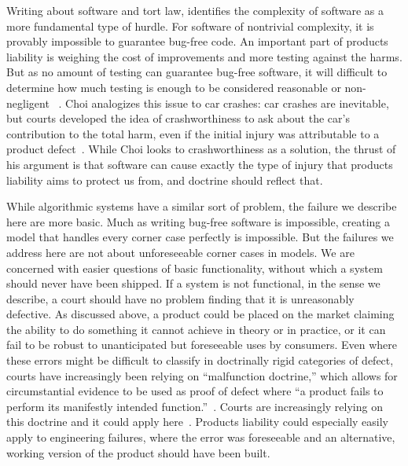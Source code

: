 \documentclass[acmconf,manuscript,screen,natbib=true]{acmart}
\begin{document}
Writing about software and tort law, \citet{choi2019crashworthy} identifies the complexity of software as a more fundamental type of hurdle. For software of nontrivial complexity, it is provably impossible to guarantee bug-free code. %
An important part of products liability is weighing the cost of improvements and more testing against the harms. But as no amount of testing can guarantee bug-free software, it will difficult to determine how much testing is enough to be considered reasonable or non-negligent ~\cite{choi2019crashworthy, hubbard2014sophisticated}. Choi analogizes this issue to car crashes: car crashes are inevitable, but courts developed the idea of crashworthiness to ask about the car's contribution to the total harm, even if the initial injury was attributable to a product defect~\cite{choi2019crashworthy}. While Choi looks to crashworthiness as a solution, the thrust of his argument is that software can cause exactly the type of injury that products liability aims to protect us from, and doctrine should reflect that. %

While algorithmic systems have a similar sort of problem, the failure we describe here are more basic. Much as writing bug-free software is impossible, creating a model that handles every corner case perfectly is impossible. But the failures we address here are not about unforeseeable corner cases in models. We are concerned with easier questions of basic functionality, without which a system should never have been shipped. If a system is not functional, in the sense we describe, a court should have no problem finding that it is unreasonably defective.
As discussed above, a product could be placed on the market claiming the ability to do something it cannot achieve in theory or in practice, or it can fail to be robust to unanticipated but foreseeable uses by consumers. Even where these errors might be difficult to classify in doctrinally rigid categories of defect, courts have increasingly been relying on ``malfunction doctrine,'' which allows for circumstantial evidence to be used as proof of defect where ``a product fails to perform its manifestly intended function.''~\cite{ThirdRestatement_S3}. Courts are increasingly relying on this doctrine and it could apply here~\cite{owen2001manufacturing, geistfeld2017roadmap}. Products liability could especially easily apply to engineering failures, where the error was foreseeable and an alternative, working version of the product should have been built.
\end{document}
